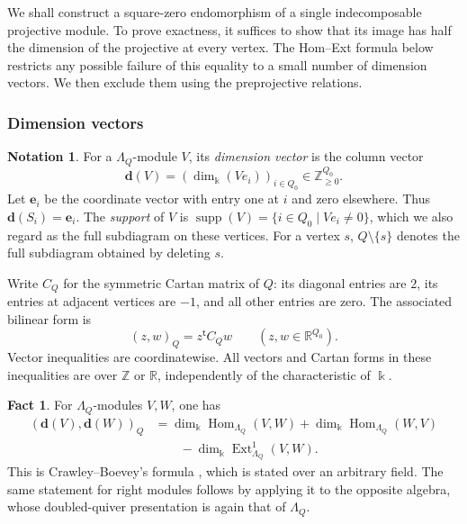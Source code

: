 \documentclass[a4paper,11pt,reqno]{amsart}
\theoremstyle{definition}
\newtheorem{notation}[notation]{Notation}
\newtheorem{fact}[fact]{Fact}
\theoremstyle{plain}
\numberwithin{equation}{section}
\newcommand{\Hom}{\operatorname{Hom}}
\newcommand{\Ext}{\operatorname{Ext}}
\newcommand{\kk}{\Bbbk}
\begin{document}
We shall construct a square-zero endomorphism of a single
indecomposable projective module.  To prove exactness, it suffices
to show that its image has half the dimension of the projective
at every vertex.  The Hom--Ext formula below restricts any possible
failure of this equality to a small number of dimension vectors.
We then exclude them using the preprojective relations.

\subsubsection{Dimension vectors}

\begin{notation}
\label{not:ade-dimension-vectors}
For a \(\Lambda_Q\)-module \(V\), its \emph{dimension vector} is
the column vector
\[
 \mathbf d(V)=(\dim_\kk(Ve_i))_{i\in Q_0}
 \in\mathbb Z_{\geq0}^{Q_0}.
\]
Let \(\mathbf e_i\) be the coordinate vector with entry one at
\(i\) and zero elsewhere.  Thus \(\mathbf d(S_i)=\mathbf e_i\).
The \emph{support} of \(V\) is
\(\operatorname{supp}(V)=\{i\in Q_0\mid Ve_i\ne0\}\),
which we also regard as the full subdiagram on these vertices.
For a vertex \(s\), \(Q\setminus\{s\}\) denotes the full
subdiagram obtained by deleting \(s\).

Write \(C_Q\) for the symmetric Cartan matrix of \(Q\): its
diagonal entries are \(2\), its entries at adjacent vertices are
\(-1\), and all other entries are zero.  The associated bilinear
form is
\[
 (z,w)_Q=z^{\mathsf t}C_Qw
 \qquad(z,w\in\mathbb R^{Q_0}).
\]
Vector inequalities are coordinatewise.  All vectors and Cartan
forms in these inequalities are over \(\mathbb Z\) or \(\mathbb R\),
independently of the characteristic of \(\kk\).
\end{notation}

\begin{fact}
\label{lem:ade-euler}
For \(\Lambda_Q\)-modules \(V,W\), one has
\begin{equation}
\label{eq:ade-hom-ext}
\begin{aligned}
 (\mathbf d(V),\mathbf d(W))_Q
 &=\dim_\kk\Hom_{\Lambda_Q}(V,W)
  +\dim_\kk\Hom_{\Lambda_Q}(W,V)\\
 &\qquad-\dim_\kk\Ext^1_{\Lambda_Q}(V,W).
\end{aligned}
\end{equation}
This is Crawley--Boevey's formula
\cite[Lemma~1]{CrawleyBoevey2000}, which is stated over an arbitrary
field.  The same statement for right modules follows by applying it
to the opposite algebra, whose doubled-quiver presentation is again
that of \(\Lambda_Q\).
\end{fact}
\end{document}
